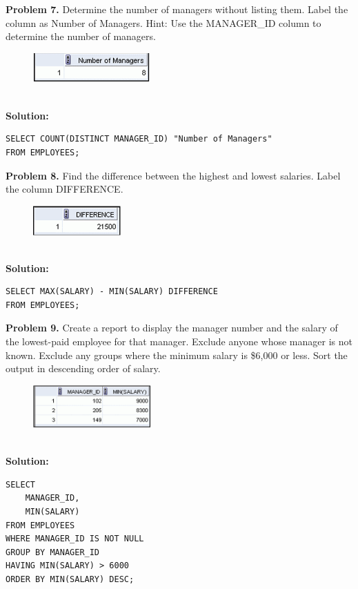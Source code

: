 \documentclass[12pt,a4paper]{article}
\begin{document}
\vspace{0.5cm}

\textbf{Problem 7.} Determine the number of managers without listing them. Label the column as Number of Managers. Hint: Use the MANAGER\_ID column to determine the number of managers.
\begin{figure}[htbp]
  \centering
  \includegraphics[width=0.4\textwidth]{Screenshots/57.png}
\end{figure}\\
\textbf{Solution:}
\begin{lstlisting}[style=sqlstyle]
SELECT COUNT(DISTINCT MANAGER_ID) "Number of Managers"
FROM EMPLOYEES;
\end{lstlisting}

\vspace{0.5cm}

\textbf{Problem 8.} Find the difference between the highest and lowest salaries. Label the column DIFFERENCE.
\begin{figure}[htbp]
  \centering
  \includegraphics[width=0.3\textwidth]{Screenshots/58.png}
\end{figure}\\
\textbf{Solution:}
\begin{lstlisting}[style=sqlstyle]
SELECT MAX(SALARY) - MIN(SALARY) DIFFERENCE
FROM EMPLOYEES;
\end{lstlisting}

\vspace{0.5cm}

\textbf{Problem 9.} Create a report to display the manager number and the salary of the lowest-paid employee for that manager. Exclude anyone whose manager is not known. Exclude any groups where the minimum salary is \$6,000 or less. Sort the output in descending order of salary.
\begin{figure}[htbp]
  \centering
  \includegraphics[width=0.4\textwidth]{Screenshots/59.png}
\end{figure}\\
\textbf{Solution:}
\begin{lstlisting}[style=sqlstyle]
SELECT 
    MANAGER_ID,
    MIN(SALARY)
FROM EMPLOYEES
WHERE MANAGER_ID IS NOT NULL
GROUP BY MANAGER_ID
HAVING MIN(SALARY) > 6000
ORDER BY MIN(SALARY) DESC;
\end{lstlisting}
\end{document}

